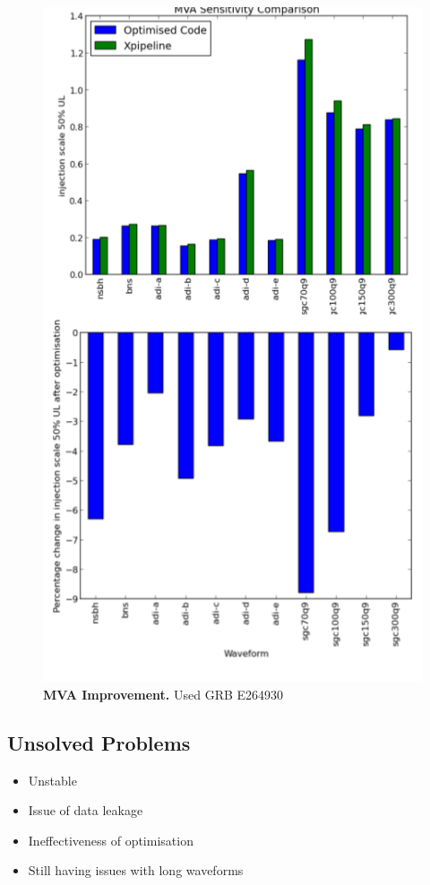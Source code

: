 \documentclass[11pt]{cuthesis}
\begin{document}
\begin{figure} %
\begin{center}
\includegraphics[width=0.8\linewidth]{x_compare.png}
\end{center}
\caption{\textbf{MVA Improvement.} Used GRB E264930  }
\label{fig:x compare}
\end{figure}

\subsection{Unsolved Problems}
\begin{itemize}
\item Unstable
\item Issue of data leakage
\item Ineffectiveness of optimisation
\item Still having issues with long waveforms
\end{itemize}
\end{document}
